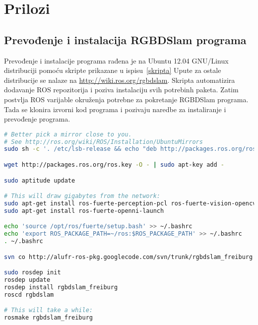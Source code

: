 \newpage
\thispagestyle{empty}

\section*{Prilozi} %
\label{sec:Prilozi}

\subsection*{Prevođenje i instalacija RGBDSlam programa} %
\label{sub:RGBDSlam prilog}

Prevođenje i instalacije programa rađena je na Ubuntu 12.04 GNU/Linux
distribuciji pomoću skripte prikazane u ispisu~\ref{skripta} Upute za
ostale distribucije se nalaze na \url{http://wiki.ros.org/rgbdslam}.
Skripta automatizira dodavanje ROS repozitorija i poziva instalaciju
svih potrebinh paketa. Zatim postvlja ROS varijable okruženja potrebne za
pokretanje RGBDSlam programa. Tada se klonira izvorni kod programa i
pozivaju naredbe za instaliranje i prevođenje programa.

\begin{lstlisting}[language=bash,label=skripta, keywords={sudo, wget, 
    echo, apt-get, rosdep, roscd, rosmake}, caption={Ispis shell skripte 
    za instalaciju rgbdslam programa}]
# Better pick a mirror close to you. 
# See http://ros.org/wiki/ROS/Installation/UbuntuMirrors
sudo sh -c '. /etc/lsb-release && echo "deb http://packages.ros.org/ros/ubuntu $DISTRIB_CODENAME main" > /etc/apt/sources.list.d/ros-latest.list' 

wget http://packages.ros.org/ros.key -O - | sudo apt-key add -

sudo aptitude update

# This will draw gigabytes from the network:
sudo apt-get install ros-fuerte-perception-pcl ros-fuerte-vision-opencv ros-fuerte-octomap-mapping python-rosdep 
sudo apt-get install ros-fuerte-openni-launch

echo 'source /opt/ros/fuerte/setup.bash' >> ~/.bashrc
echo 'export ROS_PACKAGE_PATH=~/ros:$ROS_PACKAGE_PATH' >> ~/.bashrc
. ~/.bashrc

svn co http://alufr-ros-pkg.googlecode.com/svn/trunk/rgbdslam_freiburg ~/ros/rgbdslam_freiburg

sudo rosdep init
rosdep update
rosdep install rgbdslam_freiburg
roscd rgbdslam

# This will take a while:
rosmake rgbdslam_freiburg
\end{lstlisting}



